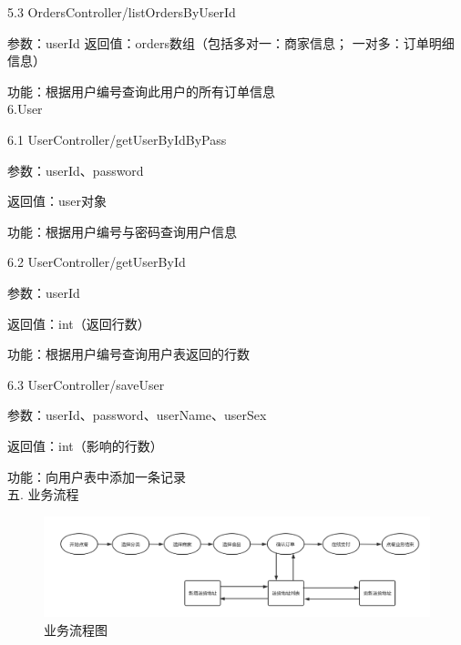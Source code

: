 5.3 OrdersController/listOrdersByUserId 

参数：userId 返回值：orders数组（包括多对一：商家信息； 一对多：订单明细信息） 

功能：根据用户编号查询此用户的所有订单信息~\\ 

6.User 

6.1 UserController/getUserByIdByPass 

参数：userId、password 

返回值：user对象 

功能：根据用户编号与密码查询用户信息 

6.2 UserController/getUserById 

参数：userId 

返回值：int（返回行数） 

功能：根据用户编号查询用户表返回的行数 

6.3 UserController/saveUser 

参数：userId、password、userName、userSex 

返回值：int（影响的行数） 

功能：向用户表中添加一条记录 ~\\

\noindent
五. 业务流程

\begin{figure}[H]
    \centering
    \includegraphics[scale=0.45]{figures/flowchart.png}
    \caption{业务流程图}
\end{figure}